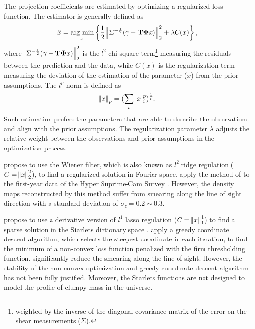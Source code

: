 \documentclass[twocolumn]{aastex62}
\newcommand{\argmin}{\mathop{\rm arg~min}\limits}
\begin{document}
The projection coefficients are estimated by optimizing a regularized loss
function. The estimator is generally defined as
\begin{equation}
\hat{x}=\argmin_{x} \left\{ \frac{1}{2}\norm{\Sigma^{-\frac{1}{2}}(\gamma-
\mathbf{T\Phi} x)}_2^2+ \lambda C(x) \right\},
\end{equation}
where $\norm{\Sigma^{-\frac{1}{2}}(\gamma - \mathbf{T\Phi} x)}_2^2$ is the
$l^2$ chi-square term\footnote{weighted by the inverse of the diagonal
covariance matrix of the error on the shear measurements ($\Sigma$).} measuring
the residuals between the prediction and the data, while $C(x)$ is the
regularization term measuring the deviation of the estimation of the parameter
($x$) from the prior assumptions. The $l^p$ norm is defined as
\begin{equation}
\norm{x}_p=(\sum_{i} |x|^p_i)^{\frac{1}{p}}.
\end{equation}
Such estimation prefers the parameters that are able to describe the
observations and align with the prior assumptions.  The regularization
parameter $\lambda$ adjusts the relative weight between the observations and
prior assumptions in the optimization process.

\citet{LSS-massMap-Wiener-Simon2009} propose to use the Wiener filter, which is
also known as $l^2$ ridge regulation ($C=\norm{x}^2_2$), to find a regularized
solution in Fourier space. \citet{HSC1-massMaps} apply the method of
\citet{LSS-massMap-Wiener-Simon2009} to the first-year data of the Hyper
Suprime-Cam Survey \citep{HSC1-data}.  However, the density maps reconstructed
by this method suffer from smearing along the line of sight direction with a
standard deviation of $\sigma_z=0.2 \sim 0.3$.

\citet{LSS-massMap-Glimpse3D-Leonard2014} propose to use a derivative version
of $l^1$ lasso regulation ($C=\norm{x}^1_1$) to find a sparse solution in the
Starlets dictionary space \citep{Starlet-Starck2015}.
\citet{LSS-massMap-Glimpse3D-Leonard2014} apply a greedy coordinate descent
algorithm, which selects the steepest coordinate in each iteration, to find the
minimum of a non-convex loss function penalized with the firm thresholding
function. \citet{LSS-massMap-Glimpse3D-Leonard2014} significantly reduce the
smearing along the line of sight. However, the stability of the non-convex
optimization and greedy coordinate descent algorithm has not been fully
justified. Moreover, the Starlets functions are not designed to model the
profile of clumpy mass in the universe.
\end{document}
